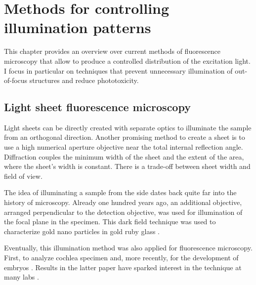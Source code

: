 
\chapter{Methods for controlling illumination patterns}
\label{sec:approaches}
%
\begin{summary}
  This chapter provides an overview over current methods of
  fluorescence microscopy that allow to produce a controlled
  distribution of the excitation light. I focus in particular on
  techniques that prevent unnecessary illumination of out-of-focus
  structures and reduce phototoxicity.
\end{summary}
\section{Light sheet fluorescence microscopy}
\label{sec:light-sheet-microscopy}
\begin{summary}
  Light sheets can be directly created with separate optics to
  illuminate the sample from an orthogonal direction. Another
  promising method to create a sheet is to use a high numerical
  aperture objective near the total internal reflection
  angle. Diffraction couples the minimum width of the sheet and the
  extent of the area, where the sheet's width is constant. There is a
  trade-off between sheet width and field of view.
\end{summary}
The idea of illuminating a sample from the side dates back quite far
into the history of microscopy. Already one hundred years ago, an
additional objective, arranged perpendicular to the detection
objective, was used for illumination of the focal plane in the
specimen. This dark field technique was used to characterize gold nano
particles in gold ruby glass \citep{Siedentopf1903}.

Eventually, this illumination method was also applied for fluorescence
microscopy. First, to analyze cochlea specimen \citep{Voie1993} and,
more recently, for the development of embryos
\citep{Huisken2004}. Results in the latter paper have sparked interest
in the technique at many labs \citep{Santi2011}.
